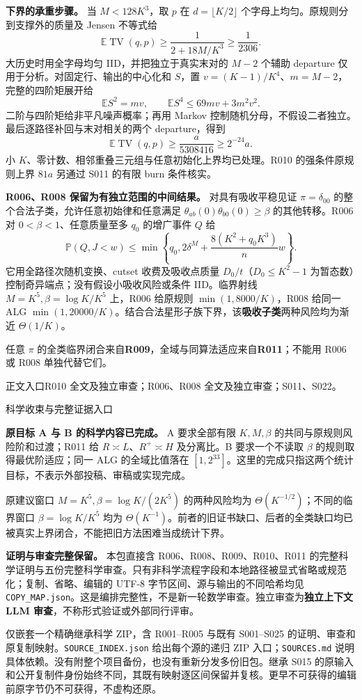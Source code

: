 \documentclass[11pt,a4paper]{article}
\newcommand{\TV}{\operatorname{TV}}\newcommand{\E}{\mathbb E}\newcommand{\Prob}{\mathbb P}
\newcommand{\head}[2]{{\small\sffamily #1}\par\vspace{2pt}{\LARGE\bfseries #2}\par\vspace{5pt}}
\newcommand{\entry}[1]{\vfill{\noindent\small\raggedright 正文入口\quad #1\par}}
\begin{document}
\textbf{下界的承重步骤。} 当 $M<128K^3$，取 $p$ 在 $d=\lfloor K/2\rfloor$ 个字母上均匀。原规则分到支撑外的质量及 Jensen 不等式给
\[
 \E\TV(q,p)\ge\frac{1}{2+18M/K^3}\ge\frac1{2306}.
\]
大历史时用全字母均匀 IID，并把独立于真实末对的 $M-2$ 个辅助 departure 仅用于分析。对固定行、输出的中心化和 $S$，置 $v=(K-1)/K^4$、$m=M-2$，完整的四阶矩展开给
\[
 \E S^2=mv,\qquad \E S^4\le69mv+3m^2v^2.
\]
二阶与四阶矩给非平凡噪声概率；再用 Markov 控制随机分母，不假设二者独立。最后逐路径补回与末对相关的两个 departure，得到
\[
 \E\TV(q,p)\ge\frac{a}{5308416}\ge2^{-24}a.
\]
小 $K$、零计数、相邻重叠三元组与任意初始化上界均已处理。R010 的强条件原规则上界 $81a$ 另通过 S011 的有限 burn 条件核实。

\textbf{R006、R008 保留为有独立范围的中间结果。} 对具有吸收平稳见证 $\pi=\delta_{00}$ 的整个合法子类，允许任意初始律和任意满足
$\theta_{ab}(0)\theta_{b0}(0)\ge\beta$ 的其他转移。R006 对 $0<\beta<1$、任意质量至多 $q_0$ 的增广事件 $Q$ 给
\[
 \Prob(Q,J<w)\le\min\left\{q_0,2\delta^M+
 \frac{8(K^2+q_0K^3)}{n}w\right\}.
\]
它用全路径次随机变换、cutset 收费及吸收点质量 $D_0/t$（$D_0\le K^2-1$ 为暂态数）控制奇异端点；没有假设小吸收风险或条件 IID。临界射线 $M=K^5,\beta=\log K/K^5$ 上，R006 给原规则 $\min(1,8000/K)$，R008 给同一 ALG $\min(1,20000/K)$。结合合法星形子族下界，该\textbf{吸收子类}两种风险均为渐近 $\Theta(1/K)$。

任意 $\pi$ 的全类临界闭合来自\textbf{R009}，全域与同算法适应来自\textbf{R011}；不能用 R006 或 R008 单独代替它们。
\entry{R010 全文及独立审查；R006、R008 全文及独立审查；S011、S022。}
\newpage
\head{科学收束与完整证据入口}{采用范围和历史记录}
\textbf{原目标 A 与 B 的科学内容已完成。} A 要求全部有限 $K,M,\beta$ 的共同与原规则风险阶和过渡；R011 给 $R\asymp L$、$R^+\asymp H$ 及分离比。B 要求一个不读取 $\beta$ 的规则取得最优阶适应；同一 ALG 的全域比值落在 $[1,2^{33}]$。这里的完成只指这两个统计目标，不表示外部投稿、审稿或实现完成。

原建议窗口 $M=K^5,\beta=\log K/(2K^5)$ 的两种风险均为 $\Theta(K^{-1/2})$；不同的临界窗口 $\beta=\log K/K^5$ 均为 $\Theta(K^{-1})$。前者的旧证书缺口、后者的全类缺口均已被真实上界闭合，不能把旧方法困难当成统计下界。

\textbf{证明与审查完整保留。} 本包直接含 R006、R008、R009、R010、R011 的完整科学证明与五份完整科学审查。只有非科学流程字段和本地路径被显式省略或规范化；复制、省略、编辑的 UTF-8 字节区间、源与输出的不同哈希均见 \texttt{COPY\_MAP.json}。这是编排完整性，不是新一轮数学审查。独立审查为\textbf{独立上下文 LLM 审查}，不称形式验证或外部同行评审。

仅嵌套一个精确继承科学 ZIP，含 R001--R005 与既有 S001--S025 的证明、审查和原复制映射。\texttt{SOURCE\_INDEX.json} 给出每个源的递归 ZIP 入口；\texttt{SOURCES.md} 说明具体依赖。没有附整个项目备份，也没有重新分发多份旧包。继承 S015 的原输入和公开复制件身份始终不同，其既有映射逐区间保留并复核。更早不可获得的编辑前原字节仍不可获得，不虚构还原。
\end{document}
